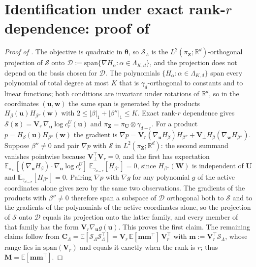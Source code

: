 \documentclass[review,hidelinks,onefignum,onetabnum]{siamart251216}
\newcommand{\RR}{\mathbb{R}}
\newcommand{\EE}{\mathbb{E}}
\newcommand{\gauss}{\gamma}
\newcommand{\mC}{\bm{C}}
\newcommand{\mV}{\bm{V}}
\newcommand{\vz}{\bm{z}}
\newcommand{\vZ}{\bm{Z}}
\newcommand{\vu}{\bm{u}}
\newcommand{\vU}{\bm{U}}
\newcommand{\vw}{\bm{w}}
\newcommand{\vW}{\bm{W}}
\newcommand{\scS}{\mathcal{S}}
\begin{document}

\section{Identification under exact rank-$r$ dependence: proof of }
\label{app:pilot-subspace}
\begin{proof}[Proof of ]
The objective is quadratic in $\bm\theta$, so $\scS_\Lambda$ is the $L^2(\pi_{\vZ};\RR^d)$-orthogonal projection of $\scS$ onto $\mathcal D := \mathrm{span}\{\nabla H_\alpha : \alpha \in \Lambda_{K,d}\}$, and the projection does not depend on the basis chosen for $\mathcal D$. The polynomials $\{H_\alpha : \alpha \in \Lambda_{K,d}\}$ span every polynomial of total degree at most $K$ that is $\gauss_d$-orthogonal to constants and to linear functions; both conditions are invariant under rotations of $\RR^d$, so in the coordinates $(\vu, \vw)$ the same span is generated by the products $H_\beta(\vu)H_{\beta''}(\vw)$ with $2 \le |\beta|_1 + |\beta''|_1 \le K$. Exact rank-$r$ dependence gives $\scS(\vz) = \mV_r\,\nabla_{\vu}\log c_r^{U}(\vu)$ and $\pi_{\vZ} = \pi_{\vU}\otimes\gauss_{d-r}$. For a product $p = H_\beta(\vu)H_{\beta''}(\vw)$ the gradient is $\nabla p = \mV_r(\nabla_{\vu}H_\beta)H_{\beta''} + \mV_\perp H_\beta(\nabla_{\vw}H_{\beta''})$. Suppose $\beta'' \neq 0$ and pair $\nabla p$ with $\scS$ in $L^2(\pi_{\vZ};\RR^d)$: the second summand vanishes pointwise because $\mV_\perp^\top\mV_r = 0$, and the first has expectation $\EE_{\pi_{\vU}}[(\nabla_{\vu}H_\beta)\cdot\nabla_{\vu}\log c_r^{U}]\;\EE_{\gauss_{d-r}}[H_{\beta''}] = 0$, since $H_{\beta''}(\vW)$ is independent of $\vU$ and $\EE_{\gauss_{d-r}}[H_{\beta''}] = 0$. Pairing $\nabla p$ with $\nabla g$ for any polynomial $g$ of the active coordinates alone gives zero by the same two observations. The gradients of the products with $\beta'' \neq 0$ therefore span a subspace of $\mathcal D$ orthogonal both to $\scS$ and to the gradients of the polynomials of the active coordinates alone, so the projection of $\scS$ onto $\mathcal D$ equals its projection onto the latter family, and every member of that family has the form $\mV_r\nabla_{\vu}g(\vu)$. This proves the first claim. The remaining claims follow from $\mC_\Lambda = \EE[\scS_\Lambda\scS_\Lambda^\top] = \mV_r\,\EE[\bm m\bm m^\top]\,\mV_r^\top$ with $\bm m := \mV_r^\top\scS_\Lambda$, whose range lies in $\mathrm{span}(\mV_r)$ and equals it exactly when the rank is $r$; thus $\mathbf M = \EE[\bm m\bm m^\top]$.
\end{proof}
\end{document}
